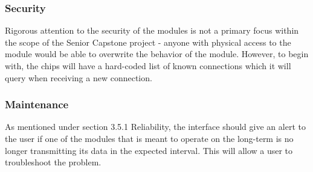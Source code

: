 \documentclass[onecolumn, draftclsnofoot,10pt, compsoc]{IEEEtran}
\begin{document}
		\subsubsection{Security}
		Rigorous attention to the security of the modules is not a primary focus within the scope of the Senior Capstone project - anyone with physical access to the module would be able to overwrite the behavior of the module. However, to begin with, the chips will have a hard-coded list of known connections which it will query when receiving a new connection.

		\subsubsection{Maintenance}
		As mentioned under section 3.5.1 Reliability, the interface should give an alert to the user if one of the modules that is meant to operate on the long-term is no longer transmitting its data in the expected interval. This will allow a user to troubleshoot the problem.

\newpage

\noindent{}
\end{document}
